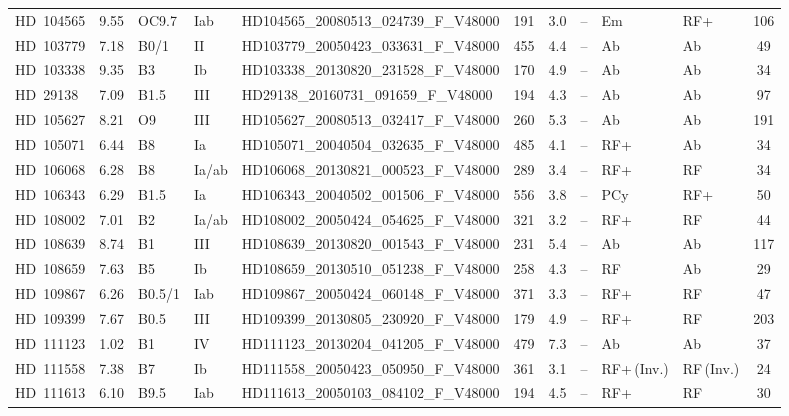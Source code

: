 {\begin{landscape}
\begin{longtable}{lclllcclllc}
\noalign{\smallskip}
HD~104565 & 9.55 & OC9.7 & Iab & HD104565\_20080513\_024739\_F\_V48000 & 191 & 3.0 & -- & Em & RF+ & 106 \\
\noalign{\smallskip}
HD~103779 & 7.18 & B0/1 & II & HD103779\_20050423\_033631\_F\_V48000 & 455 & 4.4 & -- & Ab & Ab & 49 \\
\noalign{\smallskip}
HD~103338 & 9.35 & B3 & Ib & HD103338\_20130820\_231528\_F\_V48000 & 170 & 4.9 & -- & Ab & Ab & 34 \\
\noalign{\smallskip}
HD~29138 & 7.09 & B1.5 & III & HD29138\_20160731\_091659\_F\_V48000 & 194 & 4.3 & -- & Ab & Ab & 97 \\
\noalign{\smallskip}
HD~105627 & 8.21 & O9 & III & HD105627\_20080513\_032417\_F\_V48000 & 260 & 5.3 & -- & Ab & Ab & 191 \\
\noalign{\smallskip}
HD~105071 & 6.44 & B8 & Ia & HD105071\_20040504\_032635\_F\_V48000 & 485 & 4.1 & -- & RF+ & Ab & 34 \\
\noalign{\smallskip}
HD~106068 & 6.28 & B8 & Ia/ab & HD106068\_20130821\_000523\_F\_V48000 & 289 & 3.4 & -- & RF+ & RF & 34 \\
\noalign{\smallskip}
HD~106343 & 6.29 & B1.5 & Ia & HD106343\_20040502\_001506\_F\_V48000 & 556 & 3.8 & -- & PCy & RF+ & 50 \\
\noalign{\smallskip}
HD~108002 & 7.01 & B2 & Ia/ab & HD108002\_20050424\_054625\_F\_V48000 & 321 & 3.2 & -- & RF+ & RF & 44 \\
\noalign{\smallskip}
HD~108639 & 8.74 & B1 & III & HD108639\_20130820\_001543\_F\_V48000 & 231 & 5.4 & -- & Ab & Ab & 117 \\
\noalign{\smallskip}
HD~108659 & 7.63 & B5 & Ib & HD108659\_20130510\_051238\_F\_V48000 & 258 & 4.3 & -- & RF & Ab & 29 \\
\noalign{\smallskip}
HD~109867 & 6.26 & B0.5/1 & Iab & HD109867\_20050424\_060148\_F\_V48000 & 371 & 3.3 & -- & RF+ & RF & 47 \\
\noalign{\smallskip}
HD~109399 & 7.67 & B0.5 & III & HD109399\_20130805\_230920\_F\_V48000 & 179 & 4.9 & -- & RF+ & RF & 203 \\
\noalign{\smallskip}
HD~111123 & 1.02 & B1 & IV & HD111123\_20130204\_041205\_F\_V48000 & 479 & 7.3 & -- & Ab & Ab & 37 \\
\noalign{\smallskip}
HD~111558 & 7.38 & B7 & Ib & HD111558\_20050423\_050950\_F\_V48000 & 361 & 3.1 & -- & RF+\,(Inv.) & RF\,(Inv.) & 24 \\
\noalign{\smallskip}
HD~111613 & 6.10 & B9.5 & Iab & HD111613\_20050103\_084102\_F\_V48000 & 194 & 4.5 & -- & RF+ & RF & 30 \\

\end{longtable}
\end{landscape}}
